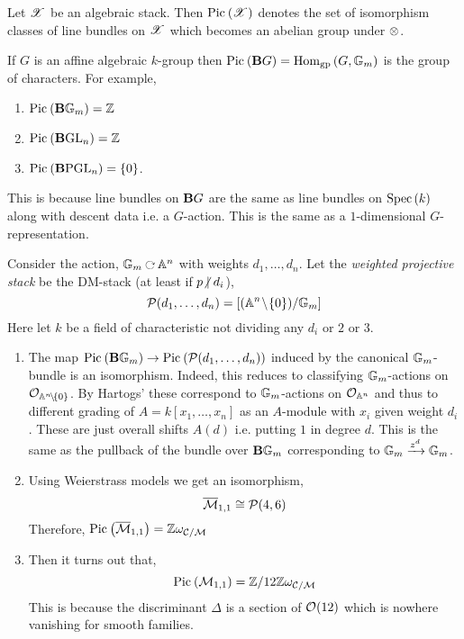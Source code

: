 \documentclass[12pt]{article}
\begin{document}
\newcommand{\Mbar}{\overline{\M}}

Let $\mathscr{X}$ be an algebraic stack. Then $\mathrm{Pic}^{} \left( \mathscr{X} \right)$ denotes the set of isomorphism classes of line bundles on $\mathscr{X}$ which becomes an abelian group under $\otimes$.

\begin{example}
If $G$ is an affine algebraic $k$-group then $\mathrm{Pic}^{} \left( \mathbf{B} G \right) = \mathrm{Hom}_{\text{gp}} \left( G, {\mathbb{G}_m} \right)$ is the group of characters. For example, 
\begin{enumerate}
\item $\mathrm{Pic}^{} \left( \mathbf{B} {\mathbb{G}_m} \right) = \mathbb{Z}$
\item $\mathrm{Pic}^{} \left( \mathbf{B} \mathrm{GL}_n \right) = \mathbb{Z}$
\item $\mathrm{Pic}^{} \left( \mathbf{B} \mathrm{PGL}_n \right) = \{ 0 \}$.
\end{enumerate}
This is because line bundles on $\mathbf{B} G$ are the same as line bundles on $\mathrm{Spec}\left( k \right)$ along with descent data i.e. a $G$-action. This is the same as a $1$-dimensional $G$-representation. 
\end{example}

\begin{example}
Consider the action, $\Gm \acts \A^n$ with weights $d_1, \dots, d_n$. Let the \textit{weighted projective stack} be the DM-stack (at least if $p \ndivides d_i$),
\[ \mathcal{P}(d_1, \dots, d_n) = [(\mathbb{A}^n \! \setminus \! \{ 0 \}) / {\mathbb{G}_m}] \] 
Here let $k$ be a field of characteristic not dividing any $d_i$ or $2$ or $3$.
\begin{enumerate}
\item The map $\mathrm{Pic}^{} \left( \mathbf{B} {\mathbb{G}_m} \right) \to \mathrm{Pic}^{} \left( \mathcal{P}(d_1, \dots, d_n) \right)$ induced by the canonical ${\mathbb{G}_m}$-bundle is an isomorphism. Indeed, this reduces to classifying ${\mathbb{G}_m}$-actions on $\mathcal{O}_{\mathbb{A}^n \! \setminus \! \{ 0 \}}$. By Hartogs' these correspond to ${\mathbb{G}_m}$-actions on $\mathcal{O}_{\mathbb{A}^n}$ and thus to different grading of $A = k[x_1, \dots, x_n]$ as an $A$-module with $x_i$ given weight $d_i$. These are just overall shifts $A(d)$ i.e. putting $1$ in degree $d$. This is the same as the pullback of the bundle over $\mathbf{B} {\mathbb{G}_m}$ corresponding to ${\mathbb{G}_m} \xrightarrow{z^d} {\mathbb{G}_m}$.

\item Using Weierstrass models we get an isomorphism,
\[ \Mbar_{1,1} \cong \cP(4,6) \]
Therefore, $\Pic{\Mbar_{1,1}} = \Z \omega_{\C/\M}$ 

\item Then it turns out that,
\[ \mathrm{Pic}^{} \left( \mathcal{M}_{1,1} \right) = \mathbb{Z} / 12 \mathbb{Z} \omega_{\mathcal{C}/\mathcal{M}} \]
This is because the discriminant $\Delta$ is a section of $\mathcal{O}_{}(12)$ which is nowhere vanishing for smooth families.
\end{enumerate}
\end{example}
\end{document}
